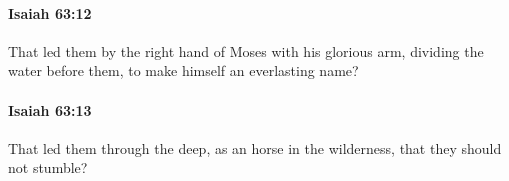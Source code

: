 		\paragraph{Isaiah 63:12} %
			\label{ISAIAH-63-12}

			That led them by the right hand of Moses with his glorious arm, dividing the water before them, to make himself an everlasting name?


		\paragraph{Isaiah 63:13} %
			\label{ISAIAH-63-13}

			That led them through the deep, as an horse in the wilderness, that they should not stumble?



